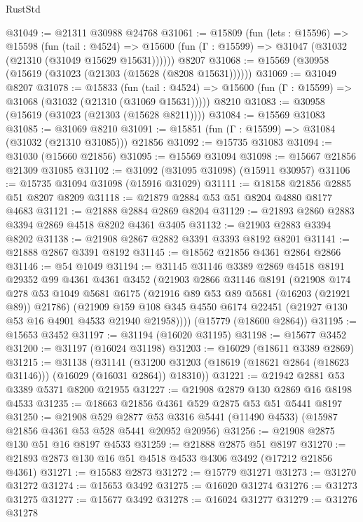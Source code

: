\begin{lexlean}{RustStd}
\begin{coremodule}
@31049 := @21311 @30988 @24768
@31061 := @15809
    (fun (lets : @15596) =>
    @15598
      (fun (tail : @4524) =>
      @15600 (fun (Γ : @15599) => @31047 (@31032 (@21310 (@31049 @15629 @15631))))))
    @8207
@31068 := @15569 (@30958 (@15619 (@31023 (@21303 (@15628 (@8208 @15631))))))
@31069 := @31049 @8207
@31078 := @15833
    (fun (tail : @4524) => @15600 (fun (Γ : @15599) => @31068 (@31032 (@21310 (@31069 @15631)))))
    @8210
@31083 := @30958 (@15619 (@31023 (@21303 (@15628 @8211))))
@31084 := @15569 @31083
@31085 := @31069 @8210
@31091 := @15851 (fun (Γ : @15599) => @31084 (@31032 (@21310 @31085))) @21856
@31092 := @15735 @31083
@31094 := @31030 (@15660 @21856)
@31095 := @15569 @31094
@31098 := @15667 @21856 @21309 @31085
@31102 := @31092 (@31095 @31098) (@15911 @30957)
@31106 := @15735 @31094 @31098 (@15916 @31029)
@31111 := @18158 @21856 @2885 @51 @8207 @8209
@31118 := @21879 @2884 @53 @51 @8204 @4880 @8177 @4683
@31121 := @21888 @2884 @2869 @8204
@31129 := @21893 @2860 @2883 @3394 @2869 @4518 @8202 @4361 @3405
@31132 := @21903 @2883 @3394 @8202
@31138 := @21908 @2867 @2882 @3391 @3393 @8192 @8201
@31141 := @21888 @2867 @3391 @8192
@31145 := @18562 @21856 @4361 @2864 @2866
@31146 := @54 @1049
@31194 := @31145
    @31146
    @3389
    @2869
    @4518
    @8191
    @29352
    @99
    @4361
    @4361
    @3452
    (@21903
      @2866
      @31146
      @8191
      (@21908
        @174
        @278
        @53
        @1049
        @5681
        @6175
        (@21916 @89 @53 @89 @5681 (@16203 (@21921 @89)) @21786)
        (@21909 @159 @108 @345 @4550 @6174 @22451 (@21927 @130 @53 @16 @4901 @4533 @21940 @21958))))
    (@15779 (@18600 @2864))
@31195 := @15653 @3452
@31197 := @31194 (@16020 @31195)
@31198 := @15677 @3452
@31200 := @31197 (@16024 @31198)
@31203 := @16029 (@18611 @3389 @2869)
@31215 := @31138
    (@31141 (@31200 @31203 (@18619 (@18621 @2864 (@18623 @31146))) (@16029 (@16031 @2864)) @18310))
@31221 := @21942 @2881 @53 @3389 @5371 @8200 @21955
@31227 := @21908 @2879 @130 @2869 @16 @8198 @4533
@31235 := @18663 @21856 @4361 @529 @2875 @53 @51 @5441 @8197
@31250 := @21908
    @529
    @2877
    @53
    @3316
    @5441
    (@11490 @4533)
    (@15987 @21856 @4361 @53 @528 @5441 @20952 @20956)
@31256 := @21908 @2875 @130 @51 @16 @8197 @4533
@31259 := @21888 @2875 @51 @8197
@31270 := @21893 @2873 @130 @16 @51 @4518 @4533 @4306 @3492 (@17212 @21856 @4361)
@31271 := @15583 @2873
@31272 := @15779 @31271
@31273 := @31270 @31272
@31274 := @15653 @3492
@31275 := @16020 @31274
@31276 := @31273 @31275
@31277 := @15677 @3492
@31278 := @16024 @31277
@31279 := @31276 @31278

\end{coremodule}
\end{lexlean}
